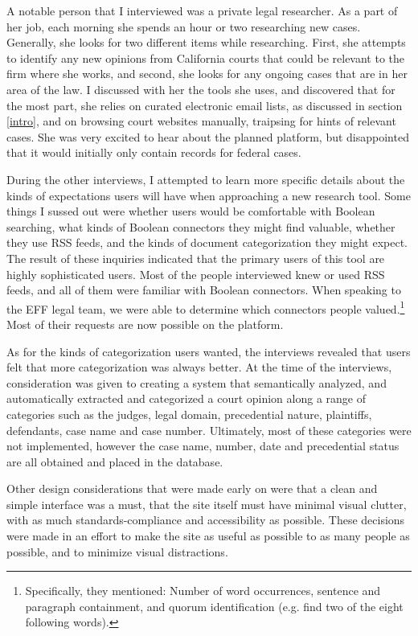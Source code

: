 A notable person that I interviewed was a private legal researcher. As a part of her job, each morning she spends an hour or two researching new cases. Generally, she looks for two different items while researching. First, she attempts to identify any new opinions from California courts that could be relevant to the firm where she works, and second, she looks for any ongoing cases that are in her area of the law. I discussed with her the tools she uses, and discovered that for the most part, she relies on curated electronic email lists, as discussed in section \ref{intro}, and on browsing court websites manually, traipsing for hints of relevant cases. She was very excited to hear about the planned platform, but disappointed that it would initially only contain records for federal cases.

During the other interviews, I attempted to learn more specific details about the kinds of expectations users will have when approaching a new research tool. Some things I sussed out were whether users would be comfortable with Boolean searching, what kinds of Boolean connectors they might find valuable, whether they use RSS feeds, and the kinds of document categorization they might expect. The result of these inquiries indicated that the primary users of this tool are highly sophisticated users. Most of the people interviewed knew or used RSS feeds, and all of them were familiar with Boolean connectors. When speaking to the EFF legal team, we were able to determine which connectors people valued.\footnote{Specifically, they mentioned: Number of word occurrences, sentence and paragraph containment, and quorum identification (e.g. find two of the eight following words).} Most of their requests are now possible on the platform.

As for the kinds of categorization users wanted, the interviews revealed that users felt that more categorization was always better. At the time of the interviews, consideration was given to creating a system that semantically analyzed, and automatically extracted and categorized a court opinion along a range of categories such as the judges, legal domain, precedential nature, plaintiffs, defendants, case name and case number. Ultimately, most of these categories were not implemented, however the case name, number, date and precedential status are all obtained and placed in the database.

Other design considerations that were made early on were that a clean and simple interface was a must, that the site itself must have minimal visual clutter, with as much standards-compliance and accessibility as possible. These decisions were made in an effort to make the site as useful as possible to as many people as possible, and to minimize visual distractions.


